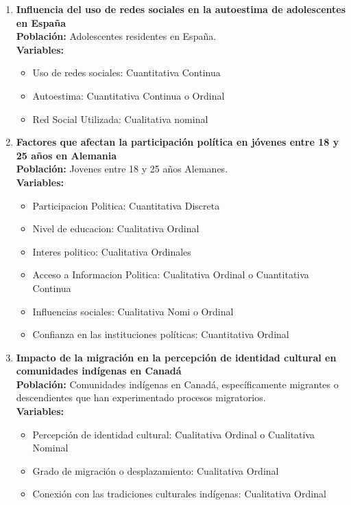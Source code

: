 \documentclass[12pt, letterpaper]{article}
\begin{document}
\begin{enumerate}
\item \textbf{Influencia del uso de redes sociales en la autoestima de adolescentes en España} \\ 
\textbf{Población:} Adolescentes residentes en España. \\ 
\textbf{Variables:}
\begin{itemize}
  \item Uso de redes sociales: Cuantitativa Continua
  \item Autoestima: Cuantitativa Continua o Ordinal
  \item Red Social Utilizada: Cualitativa nominal
\end{itemize}


\item \textbf{Factores que afectan la participación política en jóvenes entre 18 y 25 años en Alemania} \\ 
\textbf{Población:} Jovenes entre 18 y 25 años Alemanes. \\ 
\textbf{Variables:}
\begin{itemize}
  \item Participacion Politica: Cuantitativa Discreta
  \item Nivel de educacion: Cualitativa Ordinal
  \item Interes politico: Cualitativa Ordinales
  \item Acceso a Informacion Politica: Cualitativa Ordinal o Cuantitativa Continua
  \item Influencias sociales: Cualitativa Nomi o Ordinal
  \item Confianza en las instituciones políticas: Cuantitativa Ordinal
\end{itemize}

\item \textbf{Impacto de la migración en la percepción de identidad cultural en comunidades indígenas en Canadá} \\ 
\textbf{Población:} Comunidades indígenas en Canadá, específicamente migrantes o descendientes que han experimentado procesos migratorios. \\ 
\textbf{Variables:}
\begin{itemize}
  \item Percepción de identidad cultural: Cualitativa Ordinal o Cualitativa Nominal 
  \item Grado de migración o desplazamiento: Cualitativa Ordinal
  \item Conexión con las tradiciones culturales indígenas: Cualitativa Ordinal
\end{itemize}


\end{enumerate}
\end{document}
